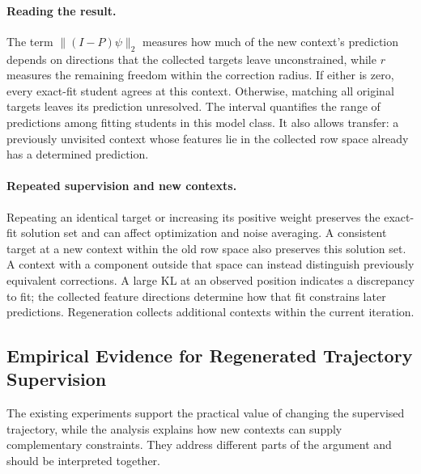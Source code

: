 \paragraph{Reading the result.} The term $\|(I-P)\psi\|_2$ measures how much of the new context's prediction depends on directions that the collected targets leave unconstrained, while $r$ measures the remaining freedom within the correction radius. If either is zero, every exact-fit student agrees at this context. Otherwise, matching all original targets leaves its prediction unresolved. The interval quantifies the range of predictions among fitting students in this model class. It also allows transfer: a previously unvisited context whose features lie in the collected row space already has a determined prediction.

\paragraph{Repeated supervision and new contexts.} Repeating an identical target or increasing its positive weight preserves the exact-fit solution set and can affect optimization and noise averaging. A consistent target at a new context within the old row space also preserves this solution set. A context with a component outside that space can instead distinguish previously equivalent corrections. A large KL at an observed position indicates a discrepancy to fit; the collected feature directions determine how that fit constrains later predictions. Regeneration collects additional contexts within the current iteration.






























\subsection{Empirical Evidence for Regenerated Trajectory Supervision}
\label{app:ident-scope}

{The existing experiments support the practical value of changing the supervised trajectory, while the analysis explains how new contexts can supply complementary constraints.} They address different parts of the argument and should be interpreted together.

